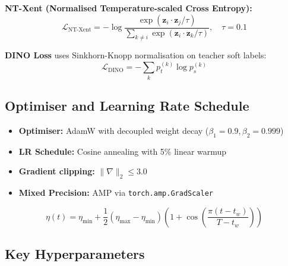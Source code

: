 \documentclass[12pt,a4paper]{article}
\begin{document}
\textbf{NT-Xent (Normalised Temperature-scaled Cross Entropy):}
\begin{equation}
    \mathcal{L}_{\text{NT-Xent}} = -\log \frac{\exp(\mathbf{z}_i \cdot \mathbf{z}_j / \tau)}{\sum_{k \neq i} \exp(\mathbf{z}_i \cdot \mathbf{z}_k / \tau)}, \quad \tau = 0.1
\end{equation}

\textbf{DINO Loss} uses Sinkhorn-Knopp normalisation on teacher soft labels:
\begin{equation}
    \mathcal{L}_{\text{DINO}} = -\sum_k p_t^{(k)} \log p_s^{(k)}
\end{equation}

\subsection{Optimiser and Learning Rate Schedule}

\begin{itemize}[leftmargin=1.5em]
    \item \textbf{Optimiser:} AdamW with decoupled weight decay ($\beta_1=0.9, \beta_2=0.999$)
    \item \textbf{LR Schedule:} Cosine annealing with 5\% linear warmup
    \item \textbf{Gradient clipping:} $\|\nabla\|_2 \leq 3.0$
    \item \textbf{Mixed Precision:} AMP via \texttt{torch.amp.GradScaler}
\end{itemize}

\begin{equation}
    \eta(t) = \eta_{\min} + \frac{1}{2}(\eta_{\max} - \eta_{\min})\left(1 + \cos\left(\frac{\pi (t - t_w)}{T - t_w}\right)\right)
\end{equation}

\subsection{Key Hyperparameters}
\end{document}
